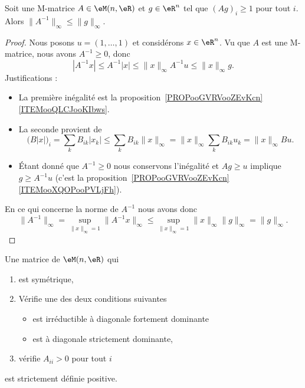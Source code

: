\begin{theorem} \label{THOooWIFGooBQpddF}
	Soit une M-matrice \( A\in \eM(n,\eR)\) et \( g\in \eR^n\) tel que \( (Ag)_i\geq 1\) pour tout \( i\). Alors \( \| A^{-1} \|_{\infty}\leq \| g \|_{\infty}\).
\end{theorem}

\begin{proof}
	Nous posons  \( u=(1,\ldots, 1)\) et considérons \( x\in \eR^n\). Vu que \( A\) est une M-matrice, nous avons \( A^{-1}\geq 0\), donc
	\begin{equation}
		| A^{-1} x |\leq A^{-1}| x |\leq \| x \|_{\infty}A^{-1}u\leq \| x \|_{\infty}g.
	\end{equation}
	Justifications :
	\begin{itemize}
		\item La première inégalité est la proposition~\ref{PROPooGVRVooZEvKcn}\ref{ITEMooQLCJooKIbws}.
		\item La seconde provient de
		      \begin{equation}
			      \big( B| x | \big)_i=\sum_kB_{ik}| x_k |\leq\sum_kB_{ik}\| x \|_{\infty}=\| x \|_{\infty}\sum_{k}B_{ik}u_k=\| x \|_{\infty}Bu.
		      \end{equation}
		\item
		      Étant donné que \( A^{-1}\geq 0\) nous conservons l'inégalité et \( Ag\geq u\) implique \( g\geq A^{-1}u\) (c'est la proposition~\ref{PROPooGVRVooZEvKcn}\ref{ITEMooXQOPooPVLjFh}).
	\end{itemize}

	En ce qui concerne la norme de \( A^{-1}\) nous avons donc
	\begin{equation}
		\| A^{-1} \|_{\infty}=\sup_{\| x \|_{\infty}=1}\| A^{-1}x \|_{\infty}\leq \sup_{\| x \|_{\infty}=1}\| x \|_{\infty}\| g \|_{\infty}=\| g \|_{\infty}.
	\end{equation}
\end{proof}

\begin{proposition}     \label{PROPooQBWQooBbeZLO}
	Une matrice de \( \eM(n,\eR)\) qui
	\begin{enumerate}
		\item est symétrique,
		\item
		      Vérifie une des deux conditions suivantes
		      \begin{itemize}
			      \item
			            est irréductible à diagonale fortement dominante
			      \item
			            est à diagonale strictement dominante,
		      \end{itemize}
		\item vérifie \( A_{ii}>0\) pour tout \( i\)
	\end{enumerate}
	est strictement définie positive.
\end{proposition}

